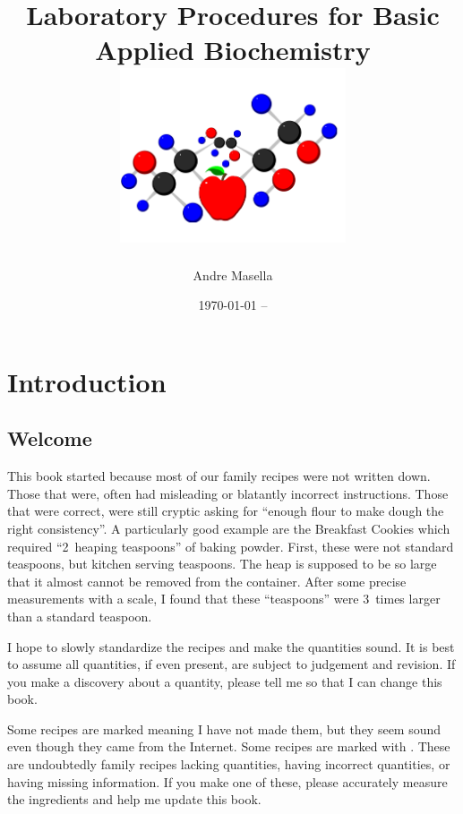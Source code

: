 \documentclass{book}
\begin{document}
\pagestyle{fancy}

\frontmatter
\thispagestyle{plain}

\title{Laboratory Procedures for Basic Applied Biochemistry \\
\includegraphics[width=0.5\textwidth,angle=-90]{CoverLogo}}
\author{Andre Masella}
\date{\today{} -- }
\maketitle

\tableofcontents

\chapter{Introduction}

\section{Welcome} 
This book started because most of our family recipes were not written down. Those that were, often had misleading or blatantly incorrect instructions. Those that were correct, were still cryptic asking for ``enough flour to make dough the right consistency''. A particularly good example are the Breakfast Cookies which required ``2~heaping teaspoons'' of baking powder. First, these were not standard teaspoons, but kitchen serving teaspoons. The heap is supposed to be so large that it almost cannot be removed from the container. After some precise measurements with a scale, I found that these ``teaspoons'' were 3~times larger than a standard teaspoon.

I hope to slowly standardize the recipes and make the quantities sound. It is best to assume all quantities, if even present, are subject to judgement and revision. If you make a discovery about a quantity, please tell me so that I can change this book.

Some recipes are marked \UNTESTED{} meaning I have not made them, but they seem sound even though they came from the Internet. Some recipes are marked with \FIXME{}. These are undoubtedly family recipes lacking quantities, having incorrect quantities, or having missing information. If you make one of these, please accurately measure the ingredients and help me update this book.
\end{document}
